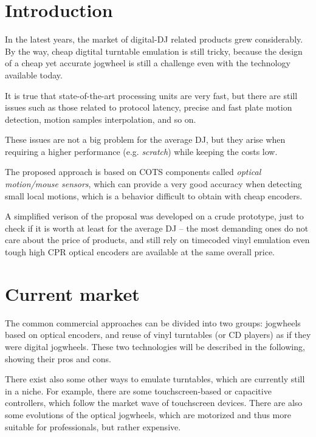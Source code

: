 \documentclass[a4paper,10pt]{article}
\begin{document}
\vspace{4ex}	%
\begin{multicols}{2}


\section{Introduction}

In the latest years, the market of digital-DJ related products grew considerably.
By the way, cheap digtital turntable emulation is still tricky, because the
design of a cheap yet accurate jogwheel is still a challenge even with the
technology available today.

It is true that state-of-the-art processing units are very fast, but there are
still issues such as those related to protocol latency, precise and fast plate
motion detection, motion samples interpolation, and so on.

These issues are not a big problem for the average DJ, but they arise when
requiring a higher performance (e.g. \emph{scratch}) while keeping the costs
low.

The proposed approach is based on COTS components called \emph{optical motion/mouse
sensors}, which can provide a very good accuracy when detecting small local
motions, which is a behavior difficult to obtain with cheap encoders.

A simplified verison of the proposal was developed on a crude prototype, just
to check if it is worth at least for the average DJ -- the most demanding ones
do not care about the price of products, and still rely on timecoded vinyl
emulation even tough high CPR optical encoders are available at the same
overall price.


\section{Current market}

The common commercial approaches can be divided into two groups: jogwheels
based on optical encoders, and reuse of vinyl turntables (or CD players) as if
they were digital jogwheels. These two technologies will be described in the
following, showing their pros and cons.

There exist also some other ways to emulate turntables, which are currently
still in a niche. For example, there are some touchscreen-based \cite{sm_emulator}
\cite{hn_touchosc} or capacitive \cite{stanton_scs3d} controllers, which
follow the market wave of touchscreen devices.
There are also some evolutions of the optical jogwheels, which are motorized
\cite{denon_sc3900} \cite{numark_v7} and thus more suitable for professionals,
but rather expensive.



\end{multicols}
\end{document}
